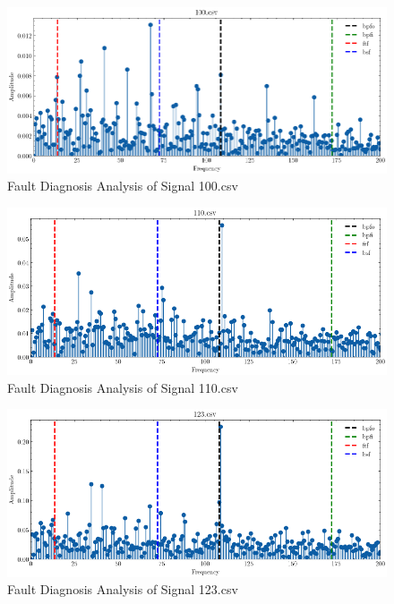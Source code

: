 \documentclass[conference]{IEEEtran}
\begin{document}
\begin{figure}[htbp]
    \centerline{\includegraphics[width=\textwidth]{figure/fig_11.png}}
    \caption{Fault Diagnosis Analysis of Signal 100.csv}
    \label{fig_11}
\end{figure}

\begin{figure}[htbp]
    \centerline{\includegraphics[width=\textwidth]{figure/fig_13.png}}
    \caption{Fault Diagnosis Analysis of Signal 110.csv}
    \label{fig_13}
\end{figure}

\begin{figure}[htbp]
    \centerline{\includegraphics[width=\textwidth]{figure/fig_10.png}}
    \caption{Fault Diagnosis Analysis of Signal 123.csv}
    \label{fig_10}
\end{figure}
\end{document}
